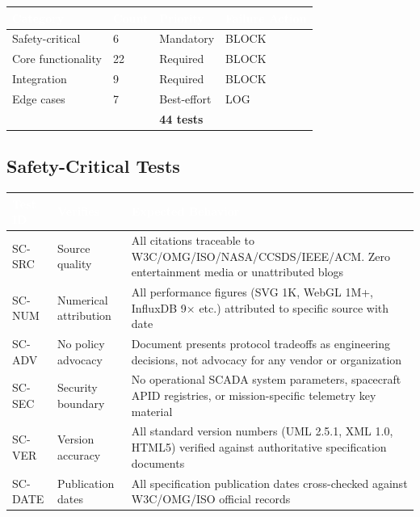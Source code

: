 \documentclass[11pt,letterpaper]{article}
\newcommand{\tableheader}[1]{\textbf{\sffamily\textcolor{white}{#1}}}
\begin{document}
\begin{center}
\begin{tabularx}{\textwidth}{L{3cm}C{1.5cm}L{2.5cm}X}
\toprule
{}
\tableheader{Category} & \tableheader{Count} & \tableheader{Priority} & \tableheader{Failure Action} \\
\midrule
Safety-critical & 6 & Mandatory & BLOCK \\
Core functionality & 22 & Required & BLOCK \\
Integration & 9 & Required & BLOCK \\
Edge cases & 7 & Best-effort & LOG \\
\midrule
{}
 & & \textbf{44 tests} \\
\bottomrule
\end{tabularx}
\end{center}

\subsection{Safety-Critical Tests}

\begin{center}
\begin{tabularx}{\textwidth}{L{1.5cm}L{4cm}X}
\toprule
{}
\tableheader{Test ID} & \tableheader{Verifies} & \tableheader{Expected Behavior} \\
\midrule
SC-SRC & Source quality & All citations traceable to W3C/OMG/ISO/NASA/CCSDS/IEEE/ACM. Zero entertainment media or unattributed blogs \\
SC-NUM & Numerical attribution & All performance figures (SVG 1K, WebGL 1M+, InfluxDB 9$\times$ etc.) attributed to specific source with date \\
SC-ADV & No policy advocacy & Document presents protocol tradeoffs as engineering decisions, not advocacy for any vendor or organization \\
SC-SEC & Security boundary & No operational SCADA system parameters, spacecraft APID registries, or mission-specific telemetry key material \\
SC-VER & Version accuracy & All standard version numbers (UML 2.5.1, XML 1.0, HTML5) verified against authoritative specification documents \\
SC-DATE & Publication dates & All specification publication dates cross-checked against W3C/OMG/ISO official records \\
\bottomrule
\end{tabularx}
\end{center}
\end{document}
